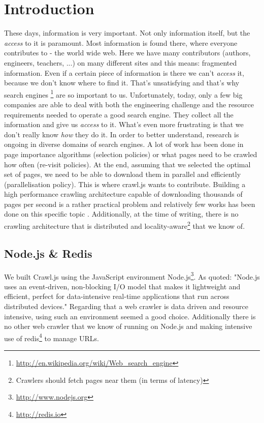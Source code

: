 
\chapter{Introduction} %

\label{Chapter1} %


These days, information is very important. Not only information itself, but the \emph{access} to it is paramount. Most information is found there, where everyone contributes to - the world wide web. Here we have many contributors (authors, engineers, teachers, ...) on many different sites and this means: fragmented information. Even if a certain piece of information is there we can't \emph{access} it, because we don't know where to find it. That's unsatisfying and that's why search engines \footnote{\url{http://en.wikipedia.org/wiki/Web_search_engine}} are so important to us.
\newline
Unfortunately, today, only a few big companies are able to deal with both the engineering challenge and the resource requirements needed to operate a good search engine. They collect all the information and give us \emph{access} to it. What's even more frustrating is that we don't really know \emph{how} they do it. In order to better understand, research is ongoing in diverse domains of search engines.
\newline
A lot of work has been done in page importance algorithms (selection policies) or what pages need to be crawled how often (re-visit policies)\cite{page_importance1}\cite{page_importance2}. At the end, assuming that we selected the optimal set of pages, we need to be able to download them in parallel and efficiently (parallelisation policy). This is where crawl.js wants to contribute. Building a high performance crawling architecture capable of downloading thousands of pages per second is a rather practical problem and relatively few works has been done on this specific topic \cite{ubicrawler}\cite{hp_crawler}. Additionally, at the time of writing, there is no crawling architecture that is distributed and locality-aware\footnote{Crawlers should fetch pages near them (in terms of latency)} that we know of.

\section{Node.js \& Redis}
We built Crawl.js using the JavaScript environment Node.js\footnote{\url{http://www.nodejs.org}}. As quoted: "Node.js uses an event-driven, non-blocking I/O model that makes it lightweight and efficient, perfect for data-intensive real-time applications that run across distributed devices." Regarding that a web crawler is data driven and resource intensive, using such an environment seemed a good choice. Additionally there is no other web crawler that we know of running on Node.js and making intensive use of redis\footnote{\url{http://redis.io}} to manage URLs.

